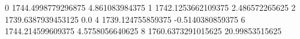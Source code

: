 0 1744.4998779296875 4.861083984375
1 1742.1253662109375 2.486572265625
2 1739.6387939453125 0.0
4 1739.124755859375 -0.5140380859375
6 1744.214599609375 4.5758056640625
8 1760.6373291015625 20.99853515625
